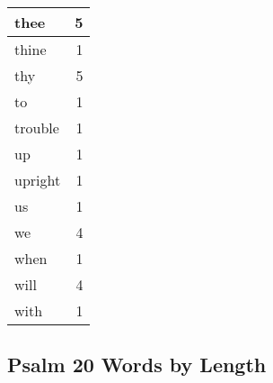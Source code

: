 \begin{center}
\begin{longtable}{l|r}
thee & 5\\ \hline 
thine & 1\\ \hline 
thy & 5\\ \hline 
to & 1\\ \hline 
trouble & 1\\ \hline 
up & 1\\ \hline 
upright & 1\\ \hline 
us & 1\\ \hline 
we & 4\\ \hline 
when & 1\\ \hline 
will & 4\\ \hline 
with & 1\\ \hline 
\end{longtable}
\end{center}





\subsection{Psalm 20 Words by Length}


\normalsize
 
